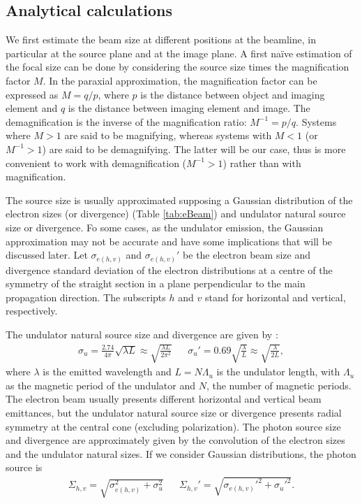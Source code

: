 \documentclass{iucr}              %
\begin{document}
\subsection{Analytical calculations}
\label{level0}

We first estimate the beam size at different positions at the beamline, in particular at the source plane and at the image plane. A first na{\"{i}}ve estimation of the focal size can be done by considering the source size times the magnification factor $M$. In the paraxial approximation, the magnification factor can be expressed as $M=q/p$, where $p$ is the distance between object and imaging element and $q$ is the distance between imaging element and image. The demagnification is the inverse of the magnification ratio: $M^{-1}=p/q$. Systems where $M>1$ are said to be magnifying, whereas systems with $M<1$ (or $M^{-1}>1$) are said to be demagnifying. The latter will be our case, thus is more convenient to work with demagnification ($M^{-1}>1$) rather than with magnification. 

The source size is usually approximated supposing a Gaussian distribution of the electron sizes (or divergence) (Table \ref{tab:eBeam}) and undulator natural source size or divergence. Fo some cases, as the undulator emission, the Gaussian approximation may not be accurate and have some implications that will be discussed later. Let $\sigma_{e(h,v)}$ and $\sigma_{e(h,v)}'$ be the electron beam size and divergence standard deviation of the electron distributions at a centre of the symmetry of the straight section in a plane perpendicular to the main propagation direction. The subscripts $h$ and $v$ stand for horizontal and vertical, respectively. 

The undulator natural source size and divergence are given by \cite{elleaume}:
\begin{align}
    \label{eq:photon small sigmas}
    \sigma_u=\frac{2.74}{4\pi}\sqrt{\lambda L}\approx \sqrt{\frac{\lambda L}{2 \pi^2}}  && \sigma_u' = 0.69\sqrt{\frac{\lambda}{L}}\approx \sqrt{\frac{\lambda}{2 L}},
\end{align}
where $\lambda$ is the emitted wavelength and $L=N\Lambda_u$ is the undulator length, with $\Lambda_u$ as the magnetic period of the undulator and $N$, the number of magnetic periods. The electron beam usually presents different horizontal and vertical beam emittances, but the undulator natural source size or divergence presents radial symmetry at the central cone (excluding polarization). The photon source size and divergence are approximately given by the convolution of the electron sizes and the undulator natural sizes. If we consider Gaussian distributions, the photon source is
\begin{align}
\label{eq:photon big sigmas}
\Sigma_{h,v}=\sqrt{\sigma_{e(h,v)}^2 + \sigma_u^2} && \Sigma_{h,v}'=\sqrt{\sigma_{e(h,v)}'^2 + \sigma_u'^2}.
\end{align}
\end{document}
